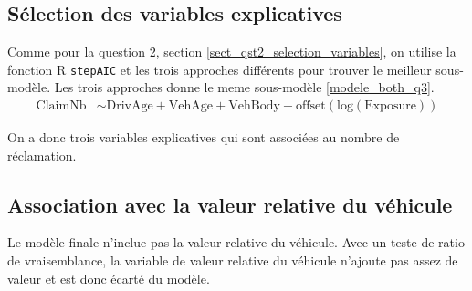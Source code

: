 \documentclass{article}
\begin{document}
	\subsection{Sélection des variables explicatives}
	
	Comme pour la question 2, section \ref{sect_qst2_selection_variables}, on utilise la fonction R \texttt{stepAIC} et les trois approches différents pour trouver le meilleur sous-modèle. Les trois approches donne le meme sous-modèle \eqref{modele_both_q3}.
	\begin{align}\label{modele_both_q3}
	\mathrm{ClaimNb} &\sim \mathrm{DrivAge + VehAge + VehBody + offset(log(Exposure))
	}
	\end{align}	
 
	On a donc trois variables explicatives qui sont associées au nombre de réclamation.
	
	\subsection{Association avec la valeur relative du véhicule}
	Le modèle finale n'inclue pas la valeur relative du véhicule. Avec un teste de ratio de vraisemblance, la variable de valeur relative du véhicule n'ajoute pas assez de valeur et est donc écarté du modèle.
	
	\appendix
\end{document}
